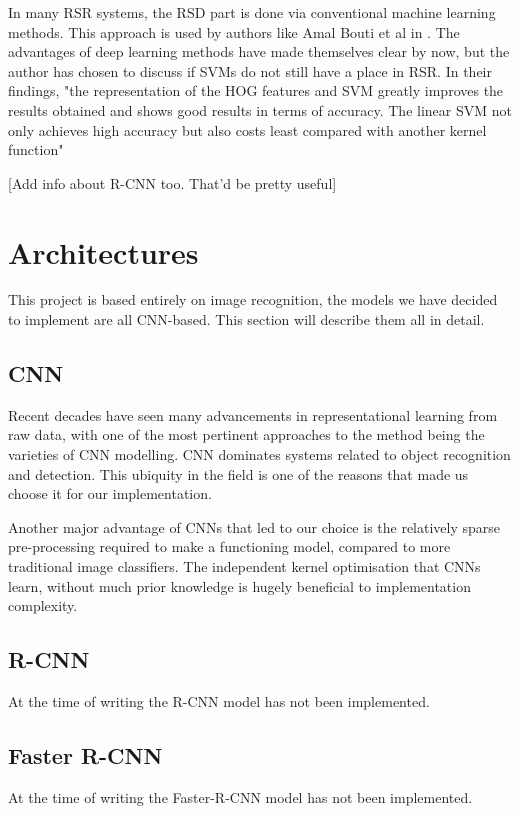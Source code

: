 \documentclass[12pt, landscape, margin=2cm]{article}
\begin{document}
\begin{multicols}{3}
In many RSR systems, the RSD part is done via conventional machine learning
methods. This approach is used by authors like Amal Bouti et al in
\citep{Recognition1}. The advantages of deep learning methods have made
themselves clear by now, but the author has chosen to discuss if SVMs do not still
have a place in RSR. In their findings, "the representation of the HOG features
and SVM greatly improves the results obtained and shows good results in terms of
accuracy. The linear SVM not only achieves high accuracy but also costs least
compared with another kernel function" \citep[6722 A. Bouti et al]{Recognition1}

[Add info about R-CNN too. That'd be pretty useful]

\section{Architectures}
This project is based entirely on image recognition, the models we have decided
to implement are all CNN-based. This section will describe them all in detail.

\subsection{CNN}
Recent decades have seen many advancements in representational learning from raw
data, with one of the most pertinent approaches to the method being the
varieties of CNN modelling. CNN dominates systems related to object recognition
and detection. This ubiquity in the field is one of the reasons that made us
choose it for our implementation.

Another major advantage of CNNs that led to our choice is the relatively sparse
pre-processing required to make a functioning model, compared to more
traditional image classifiers. The independent kernel optimisation that CNNs
learn, without much prior knowledge is hugely beneficial to implementation
complexity.

\subsection{R-CNN}
At the time of writing the R-CNN model has not been implemented.

\lipsum[3]
\subsection{Faster R-CNN}
At the time of writing the Faster-R-CNN model has not been implemented.


\end{multicols}
\end{document}
